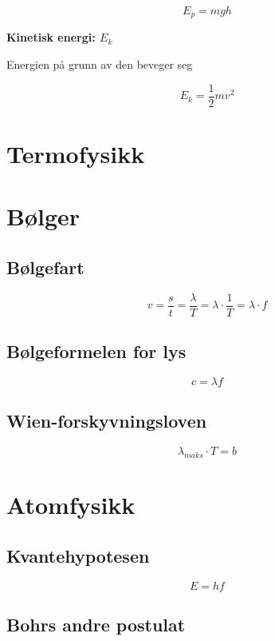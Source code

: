 \documentclass{article}
\begin{document}
$$E_p = mgh$$

\textbf{Kinetisk energi: $E_k$}

Energien på grunn av den beveger seg

$$E_k = \frac{1}{2}mv^2$$

\subsubsection{}

\section{Termofysikk}

\section{B{\o}lger}

\subsection{B{\o}lgefart}

$$v=\frac{s}{t}=\frac{\lambda}{T}=\lambda \cdot \frac{1}{T}=\lambda \cdot f$$

\subsection{B{\o}lgeformelen for lys}

$$c=\lambda f$$

\subsection{Wien-forskyvningsloven}

$$\lambda_{maks} \cdot T=b$$

\section{Atomfysikk}

\subsection{Kvantehypotesen}

$$E=hf$$

\subsection{Bohrs andre postulat}
\end{document}
